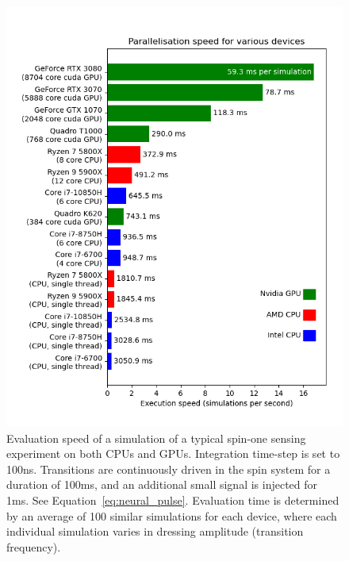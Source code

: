 \documentclass{jors}
\begin{document}
		\begin{figure}[htbp!]
			\centering
			\includegraphics[scale=0.6]{benchmark_device_aggregate.png}
			\caption{Evaluation speed of a simulation of a typical spin-one sensing experiment on both CPUs and GPUs.
			Integration time-step is set to 100ns.
			Transitions are continuously driven in the spin system for a duration of 100ms, and an additional small signal is injected for 1ms.
			See Equation~\eqref{eq:neural_pulse}.
			Evaluation time is determined by an average of 100 similar simulations for each device, where each individual simulation varies in dressing amplitude (transition frequency).}
			\label{fig:benchmark_device_aggregate}
		\end{figure}
\end{document}
